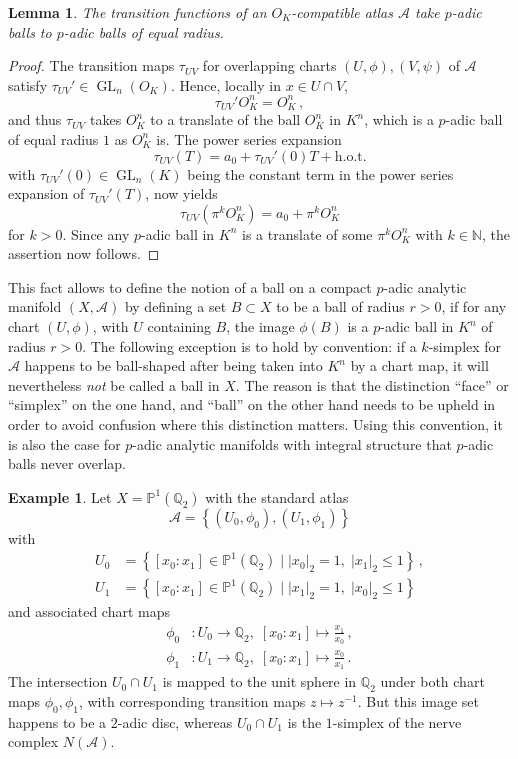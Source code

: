 \documentclass[a4paper,draft]{ZbRad}
\theoremstyle{plain}
\newtheorem{lem}{Lemma}[section]
\theoremstyle{definition}
\newtheorem{exm}{Example}[section]
\numberwithin{equation}{section}
\renewcommand{\le}{\leqslant}\renewcommand{\leq}{\leqslant}
\newcommand{\mathset}[1]{{\left\{#1\right\}}}
\newcommand{\absolute}[1]{\left\lvert#1\right\rvert}
\DeclareMathOperator{\GL}{GL}
\begin{document}
\begin{lem}\label{equalising}
The transition functions of an $O_K$-compatible atlas $\mathcal{A}$ take $p$-adic balls to $p$-adic balls of equal radius.
\end{lem}

\begin{proof}
The transition maps $\tau_{UV}$ for overlapping charts $(U,\phi),(V,\psi)$ of $\mathcal{A}$ satisfy $\tau_{UV}'\in\GL_n(O_K)$. Hence, locally in $x\in U\cap V$, 
\[
\tau_{UV}'O_K^n=O_K^n\,,
\]
and thus $\tau_{UV}$ takes $O_K^n$ to a translate of the ball $O_K^n$ in $K^n$, which is a $p$-adic ball of equal radius $1$ as $O_K^n$ is. The power series expansion
\[
\tau_{UV}(T)=a_0+\tau_{UV}'(0)T+\text{h.o.t.}
\]
with $\tau_{UV}'(0)\in\GL_n(K)$ being the constant term in the power series expansion of $\tau_{UV}'(T)$,
now yields
\[
\tau_{UV}(\pi^kO_K^n)=a_0+\pi^kO_K^n
\]
for $k>0$. Since any $p$-adic ball in $K^n$ is a translate of some $\pi^kO_K^n$ with $k\in\mathbb{N}$, the assertion now follows.
\end{proof}

This fact allows to define the notion of a ball on a compact $p$-adic analytic manifold $(X,\mathcal{A})$ by defining a set $B\subset X$ to be a ball of radius $r>0$, if for any  chart $(U,\phi)$, with $U$ containing $B$, the image $\phi(B)$ is a $p$-adic ball in $K^n$ of radius $r>0$. The following exception is to hold by convention: if a $k$-simplex for $\mathcal{A}$ happens to be ball-shaped after being taken into $K^n$ by a chart map, it will nevertheless \emph{not} be called a ball in $X$. The reason is that the distinction ``face'' or ``simplex'' on the one hand, and ``ball'' on the other hand needs to be upheld in order to avoid confusion where this distinction matters. Using this convention, it is also the case for $p$-adic analytic manifolds with integral structure that $p$-adic balls never overlap. 

\begin{exm}
Let $X=\mathbb{P}^1(\mathbb{Q}_2)$ with the standard atlas 
\[
\mathcal{A}=\mathset{(U_0,\phi_0),(U_1,\phi_1)}
\]
with
\begin{align*}
U_0&=\mathset{[x_0:x_1]\in\mathbb{P}^1(\mathbb{Q}_2)\mid\absolute{x_0}_2=1,\;\absolute{x_1}_2\le1}\,,
\\
U_1&=\mathset{[x_0:x_1]\in\mathbb{P}^1(\mathbb{Q}_2)\mid\absolute{x_1}_2=1,\;\absolute{x_0}_2\le1}
\end{align*}
and associated chart maps
\begin{align*}
\phi_0&\colon U_0\to\mathbb{Q}_2,\;[x_0:x_1]\mapsto\frac{x_1}{x_0}\,,
\\
\phi_1&\colon U_1\to\mathbb{Q}_2,\;[x_0:x_1]\mapsto\frac{x_0}{x_1}\,.
\end{align*}
The intersection $U_0\cap U_1$ is mapped to the unit sphere
in $\mathbb{Q}_2$ under both chart maps $\phi_0,\phi_1$, with corresponding transition maps $z\mapsto z^{-1}$. But this image set happens to be a $2$-adic disc, whereas $U_0\cap U_1$ is the $1$-simplex of the nerve complex $N(\mathcal{A})$. 
\end{exm}
\end{document}
